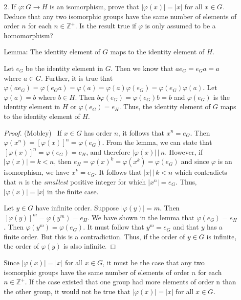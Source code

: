 \documentclass[10pt]{article}
\newcommand{\Z}{\mathbb{Z}}
\newcommand{\divides}{\, \Big | \,}
\begin{document}
\begin{itemize}

\item[2.]  If $\varphi:G\rightarrow H$ is an isomorphism, prove that $|\varphi (x)|=|x|$ for all $x\in G$.  Deduce that any two isomorphic
groups have the same number of elements of order $n$ for each $n\in\Z^{+}$.  Is the result true if $\varphi$ is only assumed to be a
homomorphism?

Lemma:  The identity element of $G$ maps to the identity element of $H$.

Let $e_{G}$ be the identity element in $G$.  Then we know that $ae_{G}=e_{G}a=a$ where $a \in G$.  Further, it is true that
$\varphi (ae_{G})=\varphi (e_{G}a)=\varphi (a)=\varphi (a) \varphi (e_{G}) = \varphi (e_{G}) \varphi (a)$.  Let $\varphi (a) = b$ where
$b \in H$.  Then $b \varphi (e_{G}) = \varphi (e_{G}) b = b$ and $\varphi (e_{G})$ is the identity element in $H$ or $\varphi (e_{G}) = e_{H}$.
Thus, the identity element of $G$ maps to the identity element of $H$.

\begin{proof}(Mobley) \ If $x \in G$ has order $n$, it follows that $x^{n}=e_{G}$.  Then $\varphi(x^{n})=\left[ \varphi(x)\right]^{n}=\varphi(e_{G})$.
From the lemma, we can state that $\left[ \varphi(x)\right]^{n}=\varphi(e_{G})=e_{H}$, and therefore $|\varphi(x)| \divides n$.  However, if $\vert \varphi(x) \vert = k < n$, then $e_H = \varphi(x)^k = \varphi(x^k) = \varphi(e_G)$ and
since $\varphi$ is an isomorphism, we have $x^k = e_G$.   It follows that $\vert x \vert \divides k < n$ which contradicts that $n$ is the \emph{smallest} positive integer for which $\vert x^n \vert = e_G$.
Thus, $|\varphi (x)|=|x|$ in
the finite case.

Let $y \in G$ have infinite order.  Suppose $|\varphi(y)|=m$.  Then $\left[ \varphi(y) \right]^{m}= \varphi(y^{m})=e_{H}$.  We have shown in the lemma
that $\varphi (e_{G}) = e_{H}$.  Then  $\varphi(y^{m})=\varphi (e_{G})$.  It must follow that $y^{m}=e_{G}$ and that $y$ has a finite order.  But this is a
contradiction.  Thus, if the order of $y \in G$ is infinite, the order of $\varphi(y)$ is also infinite.

\end{proof}

Since $|\varphi (x)|=|x|$ for all $x\in G$, it must be the case that any two isomorphic groups have the same number of elements of order $n$
for each $n\in\Z^{+}$.  If the case existed that one group had more elements of order n than the other group, it would not be true that
$|\varphi (x)|=|x|$ for all $x\in G$.


\end{itemize}
\end{document}
